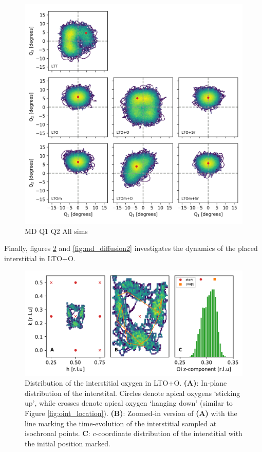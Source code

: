 \begin{figure}
	\centering
	\includegraphics[width=\textwidth]{fig/md/Q1_Q2_all.png}
	\caption[MD Q1 Q2 All sims]{MD Q1 Q2 All sims}
	\label{fig:md_q1_q2_all}
\end{figure}

Finally, figures \ref{fig:md_diffusion1} and \ref{fig:md_diffusion2} investigates the dynamics of the placed interstitial in LTO+O. 

\begin{figure}
	\centering
	\includegraphics[width=\textwidth]{fig/md/diffusion1.pdf}
	\caption[MD Oint Diffusion Oi]{Distribution of the interstitial oxygen in LTO+O. \textbf{(A)}: In-plane distribution of the interstital. Circles denote apical oxygens `sticking up', while crosses denote apical oxygen `hanging down' (similar to Figure \ref{fig:oint_location}). \textbf{(B)}: Zoomed-in version of \textbf{(A)} with the line marking the time-evolution of the interstitial sampled at isochronal points. \textbf{C}: $c$-coordinate distribution of the interstitial with the initial position marked.}
	\label{fig:md_diffusion1}
\end{figure}


